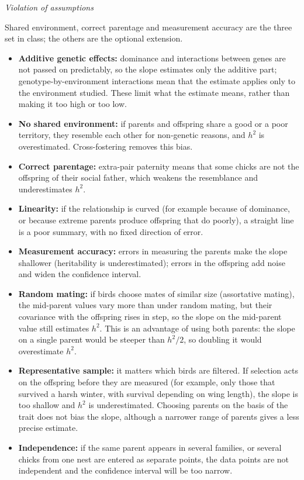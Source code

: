 \documentclass[
  a4paper]{book}
\providecommand{\tightlist}{%
  \setlength{\itemsep}{0pt}\setlength{\parskip}{0pt}}
\begin{document}
\emph{Violation of assumptions}

Shared environment, correct parentage and measurement accuracy are the three set in class; the others are the optional extension.

\begin{itemize}
\tightlist
\item
  \textbf{Additive genetic effects:} dominance and interactions between genes are not passed on predictably, so the slope estimates only the additive part; genotype-by-environment interactions mean that the estimate applies only to the environment studied. These limit what the estimate means, rather than making it too high or too low.
\item
  \textbf{No shared environment:} if parents and offspring share a good or a poor territory, they resemble each other for non-genetic reasons, and \(h^2\) is overestimated. Cross-fostering removes this bias.
\item
  \textbf{Correct parentage:} extra-pair paternity means that some chicks are not the offspring of their social father, which weakens the resemblance and underestimates \(h^2\).
\item
  \textbf{Linearity:} if the relationship is curved (for example because of dominance, or because extreme parents produce offspring that do poorly), a straight line is a poor summary, with no fixed direction of error.
\item
  \textbf{Measurement accuracy:} errors in measuring the parents make the slope shallower (heritability is underestimated); errors in the offspring add noise and widen the confidence interval.
\item
  \textbf{Random mating:} if birds choose mates of similar size (assortative mating), the mid-parent values vary more than under random mating, but their covariance with the offspring rises in step, so the slope on the mid-parent value still estimates \(h^2\). This is an advantage of using both parents: the slope on a single parent would be steeper than \(h^2/2\), so doubling it would overestimate \(h^2\).
\item
  \textbf{Representative sample:} it matters which birds are filtered. If selection acts on the offspring before they are measured (for example, only those that survived a harsh winter, with survival depending on wing length), the slope is too shallow and \(h^2\) is underestimated. Choosing parents on the basis of the trait does not bias the slope, although a narrower range of parents gives a less precise estimate.
\item
  \textbf{Independence:} if the same parent appears in several families, or several chicks from one nest are entered as separate points, the data points are not independent and the confidence interval will be too narrow.
\end{itemize}
\end{document}
